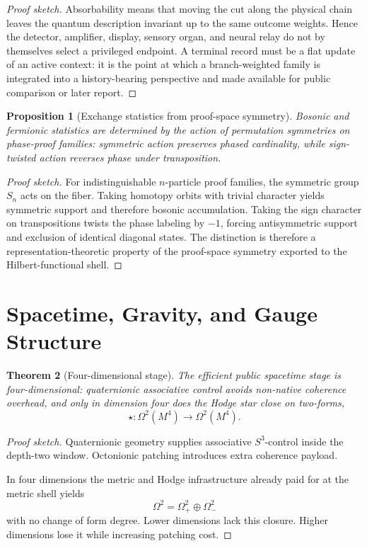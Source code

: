 \documentclass[11pt]{article}
\theoremstyle{plain}
\newtheorem{theorem}{Theorem}[section]
\newtheorem{proposition}[theorem]{Proposition}
\theoremstyle{definition}
\theoremstyle{remark}
\newenvironment{proofsketch}{\begin{proof}[Proof sketch]}{\end{proof}}
\begin{document}
\begin{proofsketch}
Absorbability means that moving the cut along the physical chain leaves the quantum description invariant up to the same outcome weights. Hence the detector, amplifier, display, sensory organ, and neural relay do not by themselves select a privileged endpoint. A terminal record must be a flat update of an active context: it is the point at which a branch-weighted family is integrated into a history-bearing perspective and made available for public comparison or later report.
\end{proofsketch}

\begin{proposition}[Exchange statistics from proof-space symmetry]
Bosonic and fermionic statistics are determined by the action of permutation symmetries on phase-proof families: symmetric action preserves phased cardinality, while sign-twisted action reverses phase under transposition.
\end{proposition}

\begin{proofsketch}
For indistinguishable \(n\)-particle proof families, the symmetric group \(S_n\) acts on the fiber. Taking homotopy orbits with trivial character yields symmetric support and therefore bosonic accumulation. Taking the sign character on transpositions twists the phase labeling by \(-1\), forcing antisymmetric support and exclusion of identical diagonal states. The distinction is therefore a representation-theoretic property of the proof-space symmetry exported to the Hilbert-functional shell.
\end{proofsketch}

\section{Spacetime, Gravity, and Gauge Structure}

\begin{theorem}[Four-dimensional stage]
The efficient public spacetime stage is four-dimensional: quaternionic associative control avoids non-native coherence overhead, and only in dimension four does the Hodge star close on two-forms,
\[
\star:\Omega^2(M^4)\to\Omega^2(M^4).
\]
\end{theorem}

\begin{proofsketch}
Quaternionic geometry supplies associative \(S^3\)-control inside the depth-two window. Octonionic patching introduces extra coherence payload.

In four dimensions the metric and Hodge infrastructure already paid for at the metric shell yields
\[
\Omega^2=\Omega^2_+\oplus\Omega^2_-
\]
with no change of form degree. Lower dimensions lack this closure. Higher dimensions lose it while increasing patching cost.
\end{proofsketch}
\end{document}
